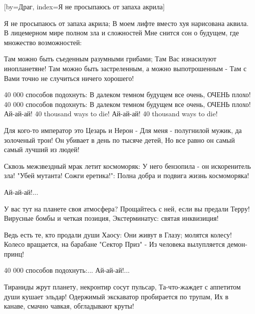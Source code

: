 [by={Драг},
                     index={Я не просыпаюсь от запаха акрила}]
\beginverse

Я не просыпаюсь от запаха акрила;
В моем лифте вместо хуя нарисована аквила.
В лицемерном мире полном зла и сложностей
Мне снится сон о будущем, где множество возможностей:

\endverse
\beginverse

Там можно быть съеденным разумными грибами;
Там Вас изнасилуют инопланетяне!
Там можно быть застреленным, а можно выпотрошенным -
Там с Вами точно не случиться ничего хорошего!

\endverse
\beginverse

40 000 способов подохнуть:
В далеком темном будущем все очень, ОЧЕНЬ плохо!
40 000 способов подохнуть:
В далеком темном будущем все очень, ОЧЕНЬ плохо!
Ай-ай-ай! 40 thousand ways to die!
Ай-ай-ай! 40 thousand ways to die!

\endverse
\beginverse

Для кого-то император это Цезарь и Нерон -
Для меня - полугнилой мужик, да золоченый трон!
Он убивает в день по тысяче детей,
Но все равно он самый самый лучший из людей!

\endverse
\beginverse

Сквозь межзвездный мрак летит космоморяк:
У него бензопила - он искоренитель зла!
"Убей мутанта! Сожги еретика!":
Полна добра и подвига жизнь космоморяка!

\endverse
\beginverse

Ай-ай-ай!...

\endverse
\beginverse

У вас тут на планете своя атмосфера?
Прощайтесь с ней, если вы предали Терру!
Вирусные бомбы и четкая позиция,
Экстерминатус: святая инквизиция!

\endverse
\beginverse

Ведь есть те, кто продали души Хаосу:
Они живут в Глазу; молятся колесу!
Колесо вращается, на барабане "Сектор Приз" -
Из человека вылупляется демон-принц!

\endverse
\beginverse

40 000 способов подохнуть:...
Ай-ай-ай!...

\endverse
\beginverse

Тираниды жрут планету, некронтир сосут пульсар,
Та-что-жаждет с аппетитом души кушает эльдар!
Одержимый экскаватор пробирается по трупам,
Их в канаве, смачно чавкая, обгладывают круты!

\endverse
\beginverse


